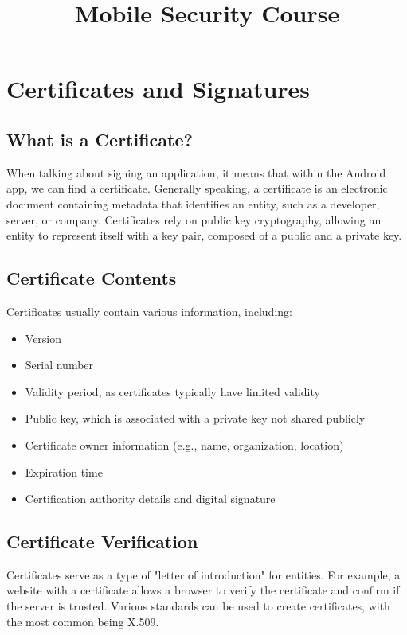 \documentclass{article}
\title{Mobile Security Course}
\author{}
\date{}
\begin{document}
\maketitle

\section{Certificates and Signatures}
\subsection{What is a Certificate?}
When talking about signing an application, it means that within the Android app, we can find a certificate. Generally speaking, a certificate is an electronic document containing metadata that identifies an entity, such as a developer, server, or company. Certificates rely on public key cryptography, allowing an entity to represent itself with a key pair, composed of a public and a private key.

\subsection{Certificate Contents}
Certificates usually contain various information, including:
\begin{itemize}
    \item Version
    \item Serial number
    \item Validity period, as certificates typically have limited validity
    \item Public key, which is associated with a private key not shared publicly
    \item Certificate owner information (e.g., name, organization, location)
    \item Expiration time
    \item Certification authority details and digital signature
\end{itemize}

\subsection{Certificate Verification}
Certificates serve as a type of "letter of introduction" for entities. For example, a website with a certificate allows a browser to verify the certificate and confirm if the server is trusted. Various standards can be used to create certificates, with the most common being X.509.
\end{document}
